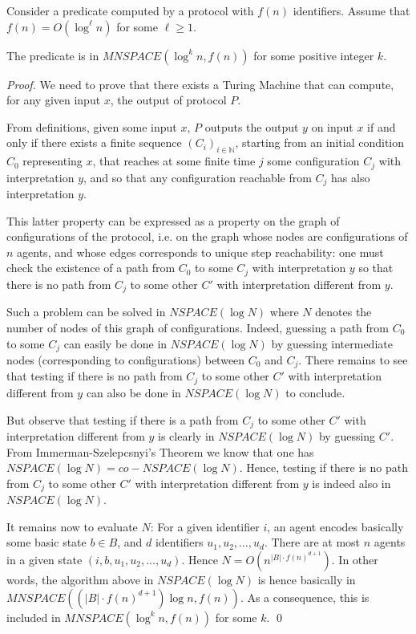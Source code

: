 \documentclass[UKenglish]{llncs}
\begin{document}
\begin{proposition}\label{th:olivier}
Consider a predicate computed by a protocol with $f(n)$
identifiers. Assume that $f(n)=O(\log^\ell n)$ for some $\ell  \ge 1$.   

The predicate is in $MNSPACE(\log^k n,f(n))$ for some positive integer $k$. 
\end{proposition}
\begin{proof}
We need to prove that there exists a Turing Machine that can compute, for any given input $x$,
the output of protocol $P$.

From definitions, given some input $x$, $P$ outputs the output $y$ on
input $x$ if and only if  there exists a finite sequence $(C_i)_{i\in\mathbb{N}}$, starting from an
initial condition $C_0$ representing $x$, that reaches at some finite time
$j$  some configuration $C_j$ with interpretation $y$, and so that any
configuration reachable from $C_j$ has also interpretation $y$. 

This latter property can be expressed as a property on the graph of
configurations of the protocol, i.e. on the graph whose nodes are
configurations of $n$ agents, and whose edges corresponds to unique step
reachability:  one must check the existence of a path
from $C_0$ to some $C_j$ with interpretation $y$ so that there is no
path from $C_j$ to some other $C'$ with interpretation different from
$y$. 

Such a problem can be solved in $NSPACE(\log N)$ where $N$
denotes the number of nodes of this graph of configurations. 
Indeed, guessing a path from $C_0$ to
some $C_j$ can easily be done in $NSPACE(\log N)$ by guessing
intermediate nodes (corresponding to configurations) between $C_0$ and $C_j$. There remains to
see that testing if there is no
path from $C_j$ to some other $C'$ with interpretation different from
$y$ can also be done in $NSPACE(\log N)$ to conclude.

But observe that testing if there is a path from $C_j$ to some other
$C'$ with interpretation different from $y$ is clearly in $NSPACE(\log
N)$ by guessing $C'$. From Immerman-Szelepcsnyi's Theorem
\cite{immerman1988nondeterministic,Szelepcsenyi} we know that one has 
$NSPACE(\log N)=co-NSPACE(\log N)$. Hence, testing if there is no path
from $C_j$ to some other $C'$ with interpretation different from
$y$ is indeed also in $NSPACE(\log N)$.

It remains now to evaluate $N$: 
For a given identifier $i$, an agent encodes basically some basic state $b
\in B$, and $d$ identifiers $u_1,u_2,\dots,u_d$. There are at most $n$ agents
in  a given state $(i,b,u_1,u_2,\dots,u_d)$.
Hence $N=O(n^{|B|\cdot f(n)^{d+1}}).$ 
In other words, the algorithm above in $NSPACE(\log N)$ is
hence basically in $MNSPACE((|B| \cdot f(n)^{d+1}) \log n,f(n))$. As a
consequence, this
is 
included in $MNSPACE(\log^k n,f(n))$
for some $k$. \hfill \qed

\end{proof}
\end{document}
